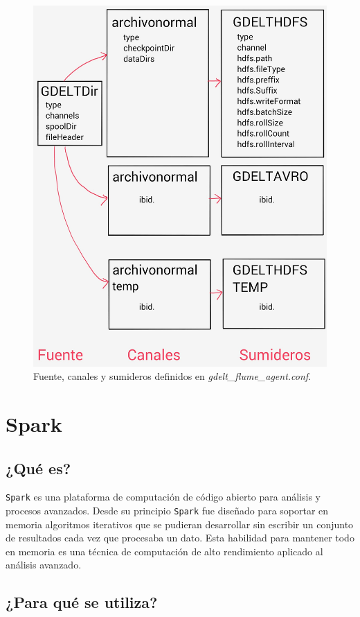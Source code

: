 \documentclass[]{article}
\begin{document}
\begin{figure}[H]
\centering
\includegraphics[width=0.8 \textwidth]{img/flume.jpg}
\caption{Fuente, canales y sumideros definidos en \emph{gdelt\_flume\_agent.conf}.}
\end{figure}

\section{Spark}\label{spark}

\subsection{¿Qué es?}\label{que-es-1}

\texttt{Spark} es una plataforma de computación de código abierto para
análisis y procesos avanzados. Desde su principio \texttt{Spark} fue
diseñado para soportar en memoria algoritmos iterativos que se pudieran
desarrollar sin escribir un conjunto de resultados cada vez que
procesaba un dato. Esta habilidad para mantener todo en memoria es una
técnica de computación de alto rendimiento aplicado al análisis
avanzado.

\subsection{¿Para qué se utiliza?}\label{para-que-se-utiliza-1}
\end{document}
